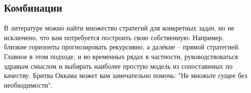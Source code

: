 \documentclass[12pt,fleqn]{article}
\begin{document}
\subsection{Комбинации}
В литературе можно найти множество стратегий для конкретных задач, но не исключено, что вам потребуется построить свою собственную.
Например, близкие горизонты прогнозировать рекурсивно, а далёкие -- прямой стратегией.
Главное в этом подходе, и во временных рядах в частности, руководствоваться здравым смыслом и выбирать наиболее простую модель из сопоставимых по качеству. 
Бритва Оккама может вам замечательно помочь: "Не множьте сущее без необходимости".
\end{document}
